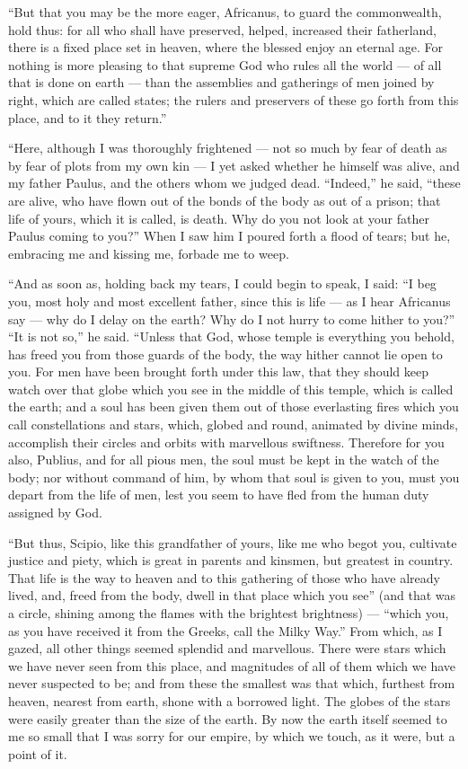  ``But that you may be the more eager, Africanus, to guard the commonwealth, hold thus: for all who shall have preserved, helped, increased their fatherland, there is a fixed place set in heaven, where the blessed enjoy an eternal age. For nothing is more pleasing to that supreme God who rules all the world --- of all that is done on earth --- than the assemblies and gatherings of men joined by right, which are called states; the rulers and preservers of these go forth from this place, and to it they return.''

 ``Here, although I was thoroughly frightened --- not so much by fear of death as by fear of plots from my own kin --- I yet asked whether he himself was alive, and my father Paulus, and the others whom we judged dead. ``Indeed,'' he said, ``these are alive, who have flown out of the bonds of the body as out of a prison; that life of yours, which it is called, is death. Why do you not look at your father Paulus coming to you?'' When I saw him I poured forth a flood of tears; but he, embracing me and kissing me, forbade me to weep.

 ``And as soon as, holding back my tears, I could begin to speak, I said: ``I beg you, most holy and most excellent father, since this is life --- as I hear Africanus say --- why do I delay on the earth? Why do I not hurry to come hither to you?'' ``It is not so,'' he said. ``Unless that God, whose temple is everything you behold, has freed you from those guards of the body, the way hither cannot lie open to you. For men have been brought forth under this law, that they should keep watch over that globe which you see in the middle of this temple, which is called the earth; and a soul has been given them out of those everlasting fires which you call constellations and stars, which, globed and round, animated by divine minds, accomplish their circles and orbits with marvellous swiftness. Therefore for you also, Publius, and for all pious men, the soul must be kept in the watch of the body; nor without command of him, by whom that soul is given to you, must you depart from the life of men, lest you seem to have fled from the human duty assigned by God.

 ``But thus, Scipio, like this grandfather of yours, like me who begot you, cultivate justice and piety, which is great in parents and kinsmen, but greatest in country. That life is the way to heaven and to this gathering of those who have already lived, and, freed from the body, dwell in that place which you see'' (and that was a circle, shining among the flames with the brightest brightness) --- ``which you, as you have received it from the Greeks, call the Milky Way.'' From which, as I gazed, all other things seemed splendid and marvellous. There were stars which we have never seen from this place, and magnitudes of all of them which we have never suspected to be; and from these the smallest was that which, furthest from heaven, nearest from earth, shone with a borrowed light. The globes of the stars were easily greater than the size of the earth. By now the earth itself seemed to me so small that I was sorry for our empire, by which we touch, as it were, but a point of it.

